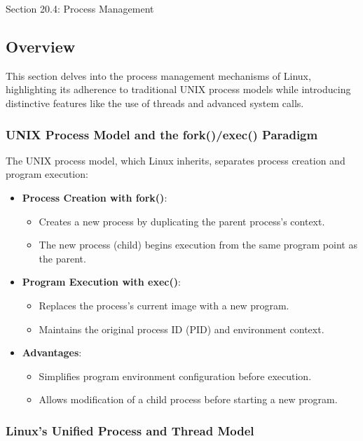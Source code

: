 \begin{notes}{Section 20.4: Process Management}
    \subsection*{Overview}

    This section delves into the process management mechanisms of Linux, highlighting its adherence to traditional UNIX process models while introducing distinctive features like the use of threads 
    and advanced system calls.
    
    \subsubsection*{UNIX Process Model and the fork()/exec() Paradigm}
    
    The UNIX process model, which Linux inherits, separates process creation and program execution:
    \begin{itemize}
        \item \textbf{Process Creation with fork()}:
        \begin{itemize}
            \item Creates a new process by duplicating the parent process's context.
            \item The new process (child) begins execution from the same program point as the parent.
        \end{itemize}
        \item \textbf{Program Execution with exec()}:
        \begin{itemize}
            \item Replaces the process's current image with a new program.
            \item Maintains the original process ID (PID) and environment context.
        \end{itemize}
        \item \textbf{Advantages}:
        \begin{itemize}
            \item Simplifies program environment configuration before execution.
            \item Allows modification of a child process before starting a new program.
        \end{itemize}
    \end{itemize}
    
    \subsubsection*{Linux's Unified Process and Thread Model}
    

\end{notes}
